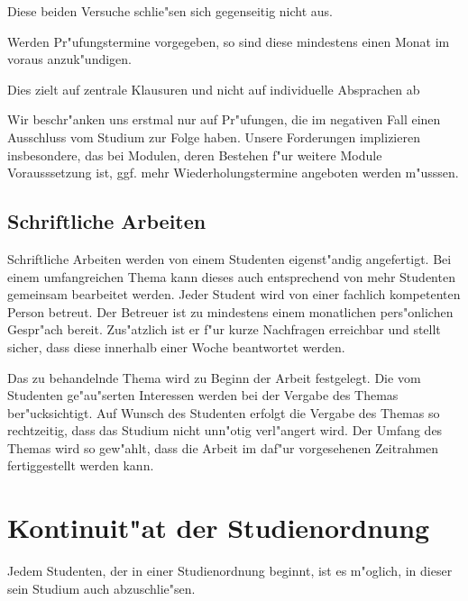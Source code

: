 \begin{kcmt}\begin{komacmt}
Diese beiden Versuche schlie"sen sich gegenseitig nicht aus.
\end{komacmt}\end{kcmt}

Werden Pr"ufungstermine vorgegeben, so sind diese mindestens einen Monat im voraus
anzuk"undigen.
\begin{kcmt}\begin{komacmt}
	Dies zielt auf zentrale Klausuren und nicht 
	auf individuelle Absprachen ab

	Wir beschr"anken uns erstmal nur auf Pr"ufungen, die im negativen Fall 
	einen Ausschluss vom Studium zur Folge haben.  Unsere Forderungen implizieren 
	insbesondere, das bei Modulen, deren Bestehen f"ur weitere Module Vorausssetzung 
	ist, ggf. mehr Wiederholungstermine angeboten werden m"usssen. 
\end{komacmt}\end{kcmt}

\subsection{Schriftliche Arbeiten}

Schriftliche Arbeiten werden von einem Studenten eigenst"andig angefertigt.
Bei einem umfangreichen Thema kann dieses auch entsprechend von mehr Studenten gemeinsam bearbeitet werden.
Jeder Student wird von einer fachlich kompetenten Person betreut.
Der Betreuer ist zu mindestens einem monatlichen pers"onlichen Gespr"ach bereit.
Zus"atzlich ist er f"ur kurze Nachfragen erreichbar und stellt sicher, dass diese innerhalb einer Woche beantwortet werden.

Das zu behandelnde Thema wird zu Beginn der Arbeit festgelegt.
Die vom Studenten ge"au"serten Interessen werden bei der Vergabe des Themas ber"ucksichtigt.
Auf Wunsch des Studenten erfolgt die Vergabe des Themas so rechtzeitig, dass das Studium nicht unn"otig verl"angert wird.
Der Umfang des Themas wird so gew"ahlt, dass die Arbeit im daf"ur vorgesehenen Zeitrahmen fertiggestellt werden kann.


\section{Kontinuit"at der Studienordnung}

Jedem Studenten, der in einer Studienordnung beginnt, ist es m"oglich, in dieser sein Studium auch abzuschlie"sen.

